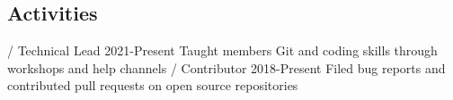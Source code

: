 \begin{outline}
\0 \section{Activities}
     / Technical Lead \hfill 2021-Present
        \2 Taught members Git and coding skills through workshops and help channels
     / Contributor \hfill 2018-Present
        \2 Filed bug reports and contributed pull requests on open source repositories

\end{outline}
